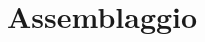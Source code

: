 \documentclass[a4paper]{article}
\begin{document}
%
%
%

\clearpage

\section{Assemblaggio}
\end{document}
